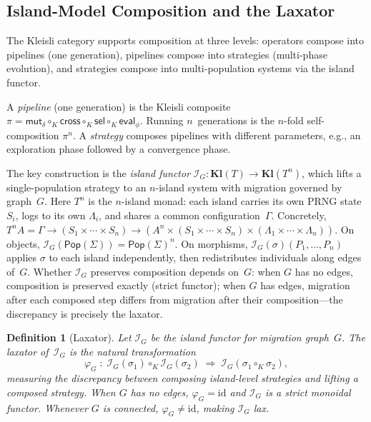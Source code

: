 \documentclass[submission,copyright,creativecommons]{eptcs}
\newtheorem{definition}{Definition}
\begin{document}
\subsection{Island-Model Composition and the Laxator}
\label{sec:three-level}

The Kleisli category supports composition at three levels: operators
compose into pipelines (one generation), pipelines compose into
strategies (multi-phase evolution), and strategies compose into
multi-population systems via the island functor.

A \emph{pipeline} (one generation) is the Kleisli composite
$\pi = \mathsf{mut}_\delta \circ_K \mathsf{cross}
  \circ_K \mathsf{sel} \circ_K \mathsf{eval}_\phi$.
Running $n$~generations is the $n$-fold self-composition $\pi^n$.
A \emph{strategy} composes pipelines with different parameters,
e.g., an exploration phase followed by a convergence phase.

The key construction is the \emph{island functor}
$\mathcal{I}_G : \mathbf{Kl}(T) \to \mathbf{Kl}(T^n)$, which lifts
a single-population strategy to an $n$-island system with migration
governed by graph~$G$. Here $T^n$ is the $n$-island monad: each
island carries its own PRNG state $S_i$, logs to its own
$\Lambda_i$, and shares a common configuration~$\Gamma$. Concretely,
$T^n\!A = \Gamma \to (S_1 \times \cdots \times S_n) \to
(A^n \times (S_1 \times \cdots \times S_n) \times
(\Lambda_1 \times \cdots \times \Lambda_n))$.
On objects,
$\mathcal{I}_G(\mathsf{Pop}(\Sigma)) = \mathsf{Pop}(\Sigma)^n$. On
morphisms, $\mathcal{I}_G(\sigma)(P_1, \ldots, P_n)$ applies
$\sigma$ to each island independently, then redistributes
individuals along edges of~$G$. Whether $\mathcal{I}_G$ preserves
composition depends on~$G$: when $G$ has no edges, composition is
preserved exactly (strict functor); when $G$ has edges, migration
after each composed step differs from migration after their
composition---the discrepancy is precisely the laxator.

\begin{definition}[Laxator]
\label{def:laxator}
Let $\mathcal{I}_G$ be the island functor for migration graph~$G$.
The \emph{laxator} of~$\mathcal{I}_G$ is the natural transformation
\[
  \varphi_G \;:\; \mathcal{I}_G(\sigma_1) \circ_K \mathcal{I}_G(\sigma_2)
  \;\Rightarrow\; \mathcal{I}_G(\sigma_1 \circ_K \sigma_2),
\]
measuring the discrepancy between composing island-level strategies
and lifting a composed strategy. When $G$ has no edges,
$\varphi_G = \mathrm{id}$ and $\mathcal{I}_G$ is a strict monoidal
functor. Whenever $G$ is connected, $\varphi_G \neq \mathrm{id}$,
making $\mathcal{I}_G$ lax.
\end{definition}
\end{document}
